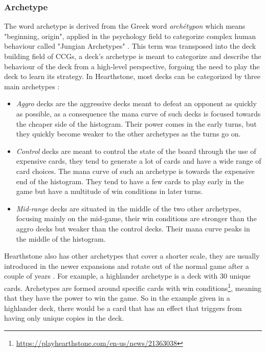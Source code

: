 \documentclass{report} %
\begin{document}
\subsubsection{Archetype}
\label{archetypes}
	The word archetype is derived from the Greek word {\it{archétypon}} which means "beginning, origin", applied in the psychology field to categorize complex human behaviour called "Jungian Archetypes" \cite{Robertson2016}. This term was transposed into the deck building field of CCGs, a deck's archetype is meant to categorize and describe the behaviour of the deck from a high-level perspective, forgoing the need to play the deck to learn its strategy. In Hearthstone, most decks can be categorized by three main archetypes \cite{Judlick}:
\begin{itemize}

\item \textit{Aggro} decks are the aggressive decks meant to defeat an opponent as quickly as possible, as a consequence the mana curve of such decks is focused towards the cheaper side of the histogram. Their power comes in the early turns, but they quickly become weaker to the other archetypes as the turns go on.
\item \textit{Control} decks are meant to control the state of the board through the use of expensive cards, they tend to generate a lot of cards and have a wide range of card choices. The mana curve of such an archetype is towards the expensive end of the histogram. They tend to have a few cards to play early in the game but have a multitude of win conditions in later turns.

\item \textit{Mid-range} decks are situated in the middle of the two other archetypes, focusing mainly on the mid-game, their win conditions are stronger than the aggro decks but weaker than the control decks. Their mana curve peaks in the middle of the histogram.
\end{itemize}

Hearthstone also has other archetypes that cover a shorter scale, they are usually introduced in the newer expansions and rotate out of the normal game after a couple of years \cite{Standard}. For example, a highlander archetype is a deck with 30 unique cards. Archetypes are formed around specific cards with win conditions\footnote{\url{https://playhearthstone.com/en-us/news/21363038}}, meaning that they have the power to win the game. So in the example given in a highlander deck, there would be a card that has an effect that triggers from having only unique copies in the deck.
 
\end{document}
